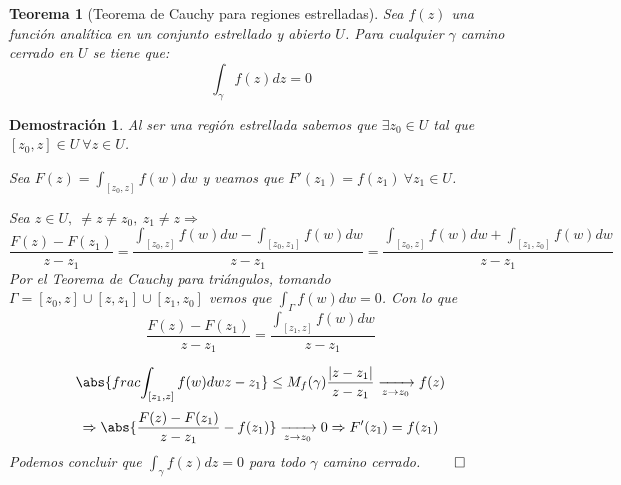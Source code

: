 \documentclass[10pt]{book}
\newtheorem{theorem}{Teorema}[chapter]
\newtheorem*{dem}{Demostración}
\begin{document}
\begin{theorem}[Teorema de Cauchy para regiones estrelladas]
Sea $f(z)$ una función analítica en un conjunto estrellado y abierto $U$. Para cualquier $\gamma$ camino cerrado en $U$ se tiene que:
$$
\int_{\gamma} f(z)dz = 0
$$
\end{theorem}

\begin{dem}
Al ser una región estrellada sabemos que $\exists z_0\in U$ tal que $[z_0,z]\in U\ \forall z \in U$.

Sea $F(z) = \int_{[z_0,z]}f(w)dw$ y veamos que $F'(z_1) = f(z_1)\ \forall z_1 \in U$.

Sea $z \in U,\ \neq z \neq z_0,\ z_1 \neq z \Rightarrow$
$$
\frac{F(z)-F(z_1)}{z-z_1} = \frac{\int_{[z_0,z]}f(w)dw- \int_{[z_0,z_1]}f(w)dw}{z-z_1} = \frac{\int_{[z_0,z]}f(w)dw+ \int_{[z_1,z_0]}f(w)dw}{z-z_1}
$$
Por el Teorema de Cauchy para triángulos, tomando $\Gamma = [z_0,z]\cup [z,z_1]\cup[z_1,z_0]$ vemos que $\int_\Gamma f(w)dw = 0$. Con lo que 
$$\frac{F(z)-F(z_1)}{z-z_1} = \frac{\int_{[z_1,z]}f(w)dw}{z-z_1}$$

$$
\abs{ frac{\int_{[z_1,z]}f(w)dw}{z-z_1}}\leq M_f(\gamma) \frac{|z-z_1|}{z-z_1} \xrightarrow[z\to z_0]{} f(z)
$$
$$
\Rightarrow \abs{\frac{F(z)-F(z_1)}{z-z_1}-f(z_1)}\xrightarrow[z\to z_0]{} 0 \Rightarrow F'(z_1) = f(z_1)
$$
Podemos concluir que $\int_\gamma f(z)dz=0$ para todo $\gamma$ camino cerrado. $\qed$
\end{dem}
\end{document}
